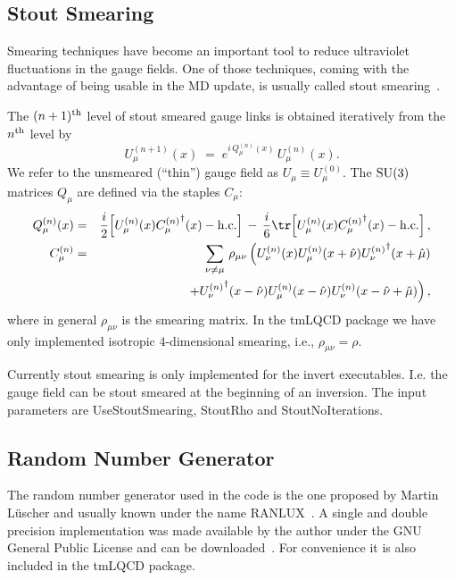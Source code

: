 \subsection{Stout Smearing}

Smearing techniques have become an important tool to reduce
ultraviolet fluctuations in the gauge fields. One of those techniques,
coming with the advantage of being usable in the MD update, is usually
called stout smearing~\cite{Morningstar:2003gk}. 

The $(n+1)^{\rm th}$ level of stout smeared gauge links is obtained iteratively
from the $n^{\rm th}$ level by
\begin{equation*}
  U_\mu^{(n+1)}(x)\;=\;e^{i\,Q_\mu^{(n)}(x)}\,U_\mu^{(n)}(x).
\end{equation*}
We refer to the unsmeared (``thin'') gauge field as $U_\mu\equiv
U_\mu^{(0)}$.
The ${\rm SU}(3)$ matrices $Q_\mu$ are defined via the staples $C_\mu$:
\begin{eqnarray}
  Q_\mu^{(n)}(x) &=& \frac{i}2\Big[U^{(n)}_\mu(x){C_\mu^{(n)}}^\dagger(x)
  - {\mathrm{h.c.}}\Big]\,-\,\frac{i}{6}\tr\Big[U^{(n)}_\mu(x){C_\mu^{(n)}}^\dagger(x)
  - {\mathrm{h.c.}}\Big]\,,\nonumber\\
  C_\mu^{(n)} &=& \sum_{\nu\neq\mu}\,\rho_{\mu\nu}\,
  \Big(U_\nu^{(n)}(x)U_\mu^{(n)}(x+\hat\nu){U_\nu^{(n)}}^\dagger(x+\hat\mu)
  \nonumber\\
  && \;\;\;
  +{U_\nu^{(n)}}^\dagger(x-\hat\nu)U_\mu^{(n)}(x-\hat\nu)U_\nu^{(n)}(x-\hat\nu+\hat\mu)
  \Big)\,,\nonumber
\end{eqnarray}
where in general $\rho_{\mu\nu}$ is the smearing matrix.
In the tmLQCD package we have only implemented isotropic $4$-dimensional
smearing, i.e., $\rho_{\mu\nu}=\rho$.

Currently stout smearing is only implemented for the {\ttfamily
  invert} executables. I.e. the gauge field can be stout smeared at
the beginning of an inversion. The input parameters are {\ttfamily
  UseStoutSmearing}, {\ttfamily StoutRho} and {\ttfamily
  StoutNoIterations}. 

\subsection{Random Number Generator}

The random number generator used in the code is the one proposed by
Martin L{\"u}scher and usually known under the name
RANLUX~\cite{Luscher:1993dy}. A single and double precision
implementation was made available by the author under the GNU General
Public License and can be downloaded~\cite{Luscher:ranluxweb}. For
convenience it is also included in the tmLQCD package.


\endinput

